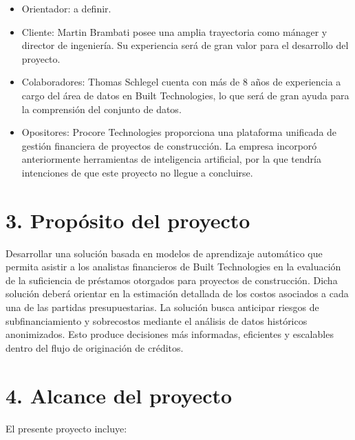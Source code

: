 \documentclass[
11pt, %
]{charter}
\begin{document}
\begin{itemize}
	\item Orientador: a definir.
	\item Cliente: Martin Brambati posee una amplia trayectoria como mánager y director de ingeniería. Su experiencia será de gran valor para el desarrollo del proyecto.
	\item Colaboradores: Thomas Schlegel cuenta con más de 8 años de experiencia a cargo del área de datos en Built Technologies, lo que será de gran ayuda para la comprensión del conjunto de datos.
	\item Opositores: Procore Technologies proporciona una plataforma unificada de gestión financiera de proyectos de construcción. La empresa incorporó anteriormente herramientas de inteligencia artificial, por la que tendría intenciones de que este proyecto no llegue a concluirse.
\end{itemize}

\section{3. Propósito del proyecto}
\label{sec:proposito}

Desarrollar una solución basada en modelos de aprendizaje automático que permita asistir a los analistas financieros de Built Technologies en la evaluación de la suficiencia de préstamos otorgados para proyectos de construcción. Dicha solución deberá orientar en la estimación detallada de los costos asociados a cada una de las partidas presupuestarias. La solución busca anticipar riesgos de subfinanciamiento y sobrecostos mediante el análisis de datos históricos anonimizados. Esto produce decisiones más informadas, eficientes y escalables dentro del flujo de originación de créditos.

\section{4. Alcance del proyecto}
\label{sec:alcance}

El presente proyecto incluye:
\end{document}

